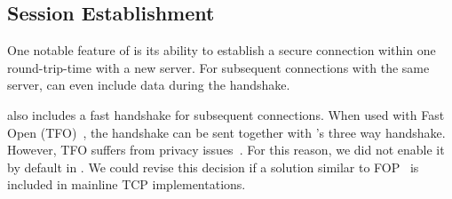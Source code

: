 \subsection{\tcpls Session Establishment}

One notable feature of \quic is its ability to establish a secure connection within
one round-trip-time with a new server. For subsequent connections with the same server, \quic can
even include data during the handshake.

 also includes a fast handshake for subsequent connections. When used with
\tcp Fast Open (TFO)~\cite{radhakrishnan2011tcp}, the \tls handshake can be sent
together with \tcp's three way handshake. However, TFO suffers from privacy
issues~\cite{sy2020enhanced}. For this reason, we did not enable it by default
in \tcpls. We could revise this decision if a solution similar to \tcp
FOP~\cite{sy2020enhanced} is included in mainline TCP implementations.





